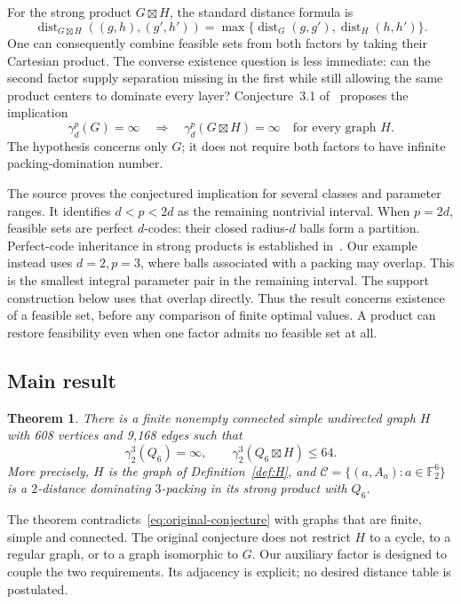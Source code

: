 \documentclass[11pt]{article}
\newtheorem{theorem}{Theorem}[section]
\theoremstyle{definition}
\theoremstyle{remark}
\newcommand{\F}{\mathbb F}
\newcommand{\dist}{\operatorname{dist}}
\newcommand{\code}{\mathcal C}
\begin{document}
For the strong product \(G\boxtimes H\), the standard distance formula is
\[
 \dist_{G\boxtimes H}((g,h),(g',h'))
   =\max\{\dist_G(g,g'),\dist_H(h,h')\}.
\]
One can consequently combine feasible sets from both factors by taking
their Cartesian product. The converse existence question is less
immediate: can the second factor supply separation missing in the first
while still allowing the same product centers to dominate every layer?
Conjecture~3.1 of~\cite{bickz-strong} proposes the implication
\begin{equation}\label{eq:original-conjecture}
 \gamma_d^p(G)=\infty
 \quad\Longrightarrow\quad
 \gamma_d^p(G\boxtimes H)=\infty
 \quad\text{for every graph }H.
\end{equation}
The hypothesis concerns only \(G\); it does not require both factors
to have infinite packing-domination number.

The source proves the conjectured implication for several classes and
parameter ranges. It identifies \(d<p<2d\) as the remaining nontrivial
interval. When \(p=2d\), feasible sets are perfect \(d\)-codes: their
closed radius-\(d\) balls form a partition. Perfect-code inheritance in
strong products is established in~\cite{perfect}. Our example instead
uses \(d=2,p=3\), where balls associated with a packing may overlap.
This is the smallest integral parameter pair in the remaining interval.
The support construction below uses that overlap directly.
Thus the result concerns existence of a feasible set, before any
comparison of finite optimal values. A product can restore feasibility
even when one factor admits no feasible set at all.

\subsection{Main result}

\begin{theorem}\label{thm:main}
There is a finite nonempty connected simple undirected graph \(H\) with
608 vertices and 9,168 edges such that
\begin{equation}\label{eq:main}
 \gamma_2^3(Q_6)=\infty,
 \qquad
 \gamma_2^3(Q_6\boxtimes H)\le 64.
\end{equation}
More precisely, \(H\) is the graph of Definition~\ref{def:H}, and
\(\code=\{(a,A_a):a\in\F_2^6\}\) is a \(2\)-distance dominating
\(3\)-packing in its strong product with \(Q_6\).
\end{theorem}

The theorem contradicts~\eqref{eq:original-conjecture} with graphs that
are finite, simple and connected. The original conjecture does not
restrict \(H\) to a cycle, to a regular graph, or to a graph isomorphic
to \(G\). Our auxiliary factor is designed to couple the two
requirements. Its adjacency is explicit; no desired distance table
is postulated.
\end{document}
